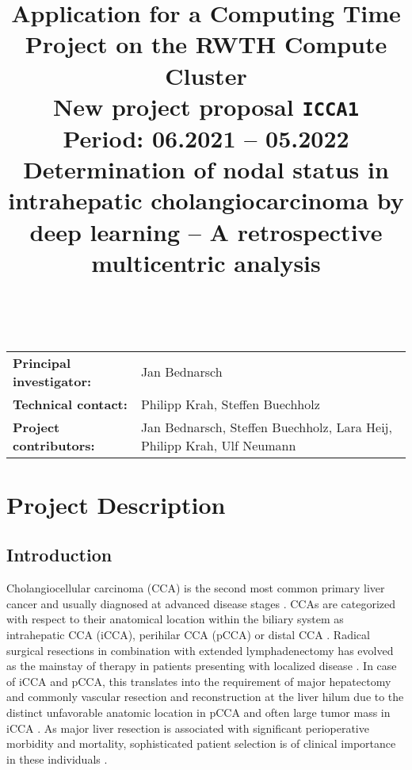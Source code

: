 \documentclass[12pt]{article}
\title{
Application for a Computing Time Project on the RWTH Compute Cluster\\[0.2em]\smaller{}New project proposal \texttt{ICCA1}\\Period: 06.2021 – 05.2022\\Determination of nodal status in intrahepatic cholangiocarcinoma by deep learning – A retrospective multicentric analysis }
\begin{document}
\maketitle
~\\
\begin{table}[H]
  \begin{center}
    \begin{tabular}{p{5cm} p{10cm}}
      \textbf{Principal investigator:} &  Jan Bednarsch\\
			\textbf{Technical contact:} & Philipp Krah, Steffen Buechholz\\
			\textbf{Project contributors:} & Jan Bednarsch, Steffen Buechholz, Lara Heij, Philipp Krah, Ulf Neumann
    \end{tabular}
  \end{center}
\end{table}

\newpage
%

\section{Project Description}


\subsection{Introduction}
Cholangiocellular carcinoma (CCA) is the second most common primary liver cancer and usually diagnosed at advanced disease stages \cite{b1,b2}. CCAs are categorized with respect to their anatomical location within the biliary system as intrahepatic CCA (iCCA), perihilar CCA (pCCA) or distal CCA \cite{b1}. Radical surgical resections in combination with extended lymphadenectomy has evolved as the mainstay of therapy in patients presenting with localized disease \cite{b3,b4,b5}. In case of iCCA and pCCA, this translates into the requirement of major hepatectomy and commonly vascular resection and reconstruction at the liver hilum due to the distinct unfavorable anatomic location in pCCA and often large tumor mass in iCCA \cite{b6,b7,b8,b9,b10}. As major liver resection is associated with significant perioperative morbidity and mortality, sophisticated patient selection is of clinical importance in these individuals \cite{b6, b11, b12}.
\end{document}
